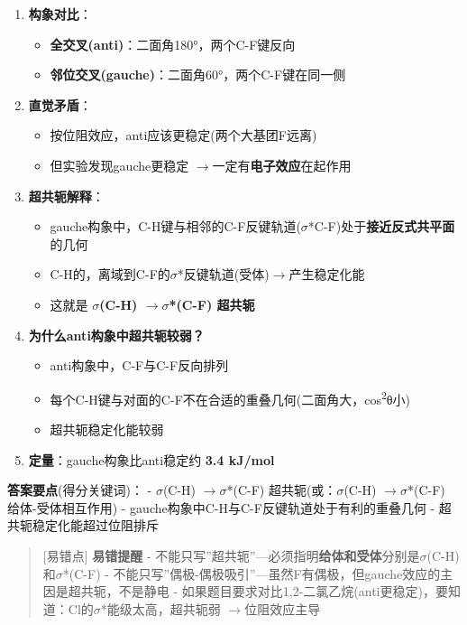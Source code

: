 \documentclass[a4paper,11pt]{ctexart}
\providecommand{\tightlist}{\setlength{\itemsep}{0pt}\setlength{\parskip}{0pt}}
\newcommand{\箭}{\ensuremath{\rightarrow}}
\newcommand{\左箭}{\ensuremath{\leftarrow}}
\newcommand{\上箭}{\ensuremath{\uparrow}}
\newcommand{\下箭}{\ensuremath{\downarrow}}
\newcommand{\衡}{\ensuremath{\rightleftharpoons}}
\newcommand{\双箭}{\ensuremath{\leftrightarrow}}
\newcommand{\约等于}{\ensuremath{\approx}}
\newcommand{\小于等于}{\ensuremath{\leq}}
\newcommand{\大于等于}{\ensuremath{\geq}}
\newcommand{\不等于}{\ensuremath{\neq}}
\newcommand{\西格马}{\ensuremath{\sigma}}
\newcommand{\派}{\ensuremath{\pi}}
\begin{document}
\begin{enumerate}
\def\labelenumi{\arabic{enumi}.}
\tightlist
\item
  \textbf{构象对比}：

  \begin{itemize}
  \tightlist
  \item
    \textbf{全交叉(anti)}：二面角180°，两个C-F键反向
  \item
    \textbf{邻位交叉(gauche)}：二面角60°，两个C-F键在同一侧
  \end{itemize}
\item
  \textbf{直觉矛盾}：

  \begin{itemize}
  \tightlist
  \item
    按位阻效应，anti应该更稳定(两个大基团F远离)
  \item
    但实验发现gauche更稳定 \箭 一定有\textbf{电子效应}在起作用
  \end{itemize}
\item
  \textbf{超共轭解释}：

  \begin{itemize}
  \tightlist
  \item
    gauche构象中，C-H键与相邻的C-F反键轨道(\西格马*C-F)处于\textbf{接近反式共平面}的几何
  \item
    C-H的，离域到C-F的\西格马*反键轨道(受体)\箭 产生稳定化能
  \item
    这就是 \textbf{\西格马(C-H) \箭 \西格马*(C-F) 超共轭}
  \end{itemize}
\item
  \textbf{为什么anti构象中超共轭较弱？}

  \begin{itemize}
  \tightlist
  \item
    anti构象中，C-F与C-F反向排列
  \item
    每个C-H键与对面的C-F不在合适的重叠几何(二面角大，cos\textsuperscript{2}θ小)
  \item
    超共轭稳定化能较弱
  \end{itemize}
\item
  \textbf{定量}：gauche构象比anti稳定约 \textbf{3.4 kJ/mol}
\end{enumerate}

\textbf{答案要点}(得分关键词)：
- \西格马(C-H) \箭 \西格马*(C-F) 超共轭(或：\西格马(C-H) \箭 \西格马*(C-F) 给体-受体相互作用)
- gauche构象中C-H与C-F反键轨道处于有利的重叠几何
- 超共轭稳定化能超过位阻排斥

\begin{quote}
{[}易错点{]} \textbf{易错提醒}
- 不能只写''超共轭''---必须指明\textbf{给体和受体}分别是\西格马(C-H)和\西格马*(C-F)
- 不能只写''偶极-偶极吸引''---虽然F有偶极，但gauche效应的主因是超共轭，不是静电
- 如果题目要求对比1,2-二氯乙烷(anti更稳定)，要知道：Cl的\西格马*能级太高，超共轭弱 \箭 位阻效应主导
\end{quote}
\end{document}

